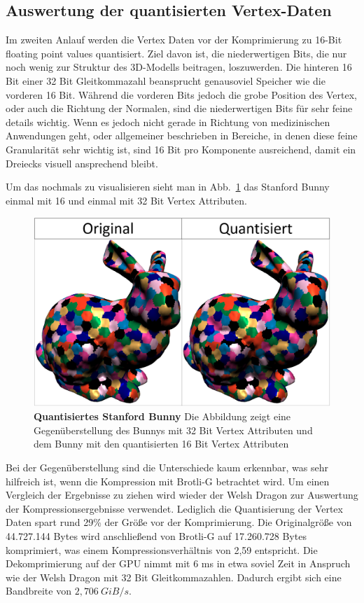 \subsection{Auswertung der quantisierten Vertex-Daten}
\label{subsec:auswertung2}
Im zweiten Anlauf werden die Vertex Daten vor der Komprimierung zu 16-Bit floating point values quantisiert.
Ziel davon ist, die niederwertigen Bits, die nur noch wenig zur Struktur des 3D-Modells beitragen, loszuwerden.
Die hinteren 16 Bit einer 32 Bit Gleitkommazahl beansprucht genausoviel Speicher wie die vorderen 16 Bit.
Während die vorderen Bits jedoch die grobe Position des Vertex, oder auch die Richtung der Normalen, sind die niederwertigen Bits für sehr feine details wichtig.
Wenn es jedoch nicht gerade in Richtung von medizinischen Anwendungen geht, oder allgemeiner beschrieben in Bereiche, in denen diese feine Granularität sehr wichtig ist, sind 16 Bit pro Komponente ausreichend, damit ein Dreiecks visuell ansprechend bleibt. \newline

Um das nochmals zu visualisieren sieht man in Abb.~\ref{fig:bunny} das Stanford Bunny einmal mit 16 und einmal mit 32 Bit Vertex Attributen.

\begin{figure}[htb]
  \centering  
  \includegraphics[scale=0.45]{Bilder/bunny_quantisiert.png}
  \caption[Quantisiertes Stanford Bunny]{\textbf{Quantisiertes Stanford Bunny} Die Abbildung zeigt eine Gegenüberstellung des Bunnys mit 32 Bit Vertex Attributen und dem Bunny mit den quantisierten 16 Bit Vertex Attributen }
  \label{fig:bunny}
\end{figure}

Bei der Gegenüberstellung sind die Unterschiede kaum erkennbar, was sehr hilfreich ist, wenn die Kompression mit Brotli-G betrachtet wird.
Um einen Vergleich der Ergebnisse zu ziehen wird wieder der Welsh Dragon zur Auswertung der Kompressionsergebnisse verwendet.
Lediglich die Quantisierung der Vertex Daten spart rund 29\% der Größe vor der Komprimierung.
Die Originalgröße von 44.727.144 Bytes wird anschließend von Brotli-G auf 17.260.728 Bytes komprimiert, was einem Kompressionsverhältnis von 2,59 entspricht.
Die Dekomprimierung auf der GPU nimmt mit 6 ms in etwa soviel Zeit in Anspruch wie der Welsh Dragon mit 32 Bit Gleitkommazahlen.
Dadurch ergibt sich eine Bandbreite von $\mathit{2,706 \ GiB/s}$. \newline

